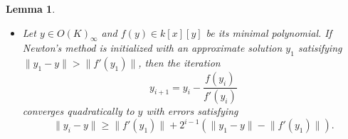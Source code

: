 \documentclass[12pt,reqno]{amsart}
\numberwithin{equation}{section}
\newtheorem{lemma}[theorem]{Lemma}
\begin{document}
\begin{lemma}
\begin{itemize}
\item[(P)] Let $y \in O(K)_{\infty}$ and $f(y) \in k[x][y]$ be its minimal polynomial. If Newton's method is initialized with an approximate solution $y_1$ satisifying $\lVert y_1-y\rVert>\lVert f'(y_1) \rVert$, then the iteration
\begin{equation*}
 y_{i+1} = y_{i} - \frac{f(y_i)}{f'(y_i)}
\end{equation*}
converges quadratically to $y$ with errors satisfying
\begin{equation*}
\lVert y_i-y \rVert \ge \lVert f'(y_1) \rVert+ 2^{i-1} (\lVert y_1-y \rVert-\lVert f'(y_1) \rVert)\text{.} 
\end{equation*}
\end{itemize}
\end{lemma}
\end{document}
